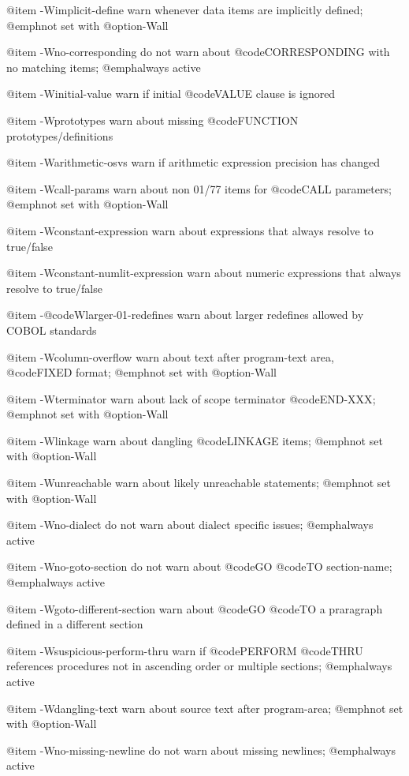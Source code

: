 @item -Wimplicit-define
warn whenever data items are implicitly defined; @emph{not} set with @option{-Wall}

@item -Wno-corresponding
do not warn about @code{CORRESPONDING} with no matching items; @emph{always} active

@item -Winitial-value
warn if initial @code{VALUE} clause is ignored

@item -Wprototypes
warn about missing @code{FUNCTION} prototypes/definitions

@item -Warithmetic-osvs
warn if arithmetic expression precision has changed

@item -Wcall-params
warn about non 01/77 items for @code{CALL} parameters; @emph{not} set with @option{-Wall}

@item -Wconstant-expression
warn about expressions that always resolve to true/false

@item -Wconstant-numlit-expression
warn about numeric expressions that always resolve to true/false

@item -@code{Wlarger-01}-redefines
warn about larger redefines allowed by COBOL standards

@item -Wcolumn-overflow
warn about text after program-text area, @code{FIXED} format; @emph{not} set with @option{-Wall}

@item -Wterminator
warn about lack of scope terminator @code{END-XXX}; @emph{not} set with @option{-Wall}

@item -Wlinkage
warn about dangling @code{LINKAGE} items; @emph{not} set with @option{-Wall}

@item -Wunreachable
warn about likely unreachable statements; @emph{not} set with @option{-Wall}

@item -Wno-dialect
do not warn about dialect specific issues; @emph{always} active

@item -Wno-goto-section
do not warn about @code{GO} @code{TO} section-name; @emph{always} active

@item -Wgoto-different-section
warn about @code{GO} @code{TO} a praragraph defined in a different section

@item -Wsuspicious-perform-thru
warn if @code{PERFORM} @code{THRU} references procedures not in ascending order or multiple sections; @emph{always} active

@item -Wdangling-text
warn about source text after program-area; @emph{not} set with @option{-Wall}

@item -Wno-missing-newline
do not warn about missing newlines; @emph{always} active

